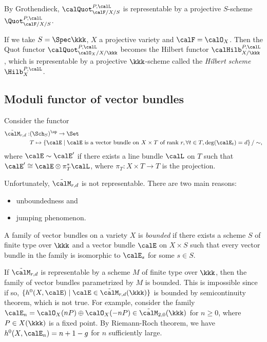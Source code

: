     By Grothendieck, \(\calQuot_{\calF/X/S}^{P,\calL}\) is representable by a projective \(S\)-scheme \(\Quot_{\calF/X/S}^{P,\calL}\).

    If we take \(S = \Spec \kkk\), \(X\) a projective variety and \(\calF = \calO_X\).
    Then the Quot functor \(\calQuot_{\calO_X/X/\kkk}^{P,\calL}\) becomes the Hilbert functor \(\calHilb_{X/\kkk}^{P,\calL}\), which is representable by a projective \(\kkk\)-scheme called the \emph{Hilbert scheme} \(\Hilb_X^{P,\calL}\).

\subsection{Moduli functor of vector bundles}

    Consider the functor 
    \begin{align*}
        \tilde{\calM}_{r,d} : & (\Sch_S)^{\op} \to \Set \\
        & T \mapsto \left\{ 
            \calE 
        \;\middle|\;
            \calE \text{ is a vector bundle on } X \times T \text{ of rank } r, \forall t \in T, \deg(\calE_t) = d
         \right\}/ \sim,
    \end{align*}
    where \(\calE \sim \calE'\) if there exists a line bundle \(\calL\) on \(T\) such that \(\calE' \cong \calE \otimes \pi_T^* \calL\), where \(\pi_T : X \times T \to T\) is the projection.

    Unfortunately, \(\tilde{\calM}_{r,d}\) is not representable.
    There are two main reasons:
    \begin{itemize}
        \item unboundedness and 
        \item jumping phenomenon.
    \end{itemize}

    \begin{definition}\label{def:bounded_family}
        A family of vector bundles on a variety \(X\) is \emph{bounded} 
        if there exists a scheme \(S\) of finite type over \(\kkk\) and a vector bundle \(\calE\) on \(X \times S\) 
        such that every vector bundle in the family is isomorphic to \(\calE_s\) for some \(s \in S\).
    \end{definition}

    If \(\tilde{\calM}_{r,d}\) is representable by a scheme \(M\) of finite type over \(\kkk\), then the family of vector bundles parametrized by \(M\) is bounded.
    This is impossible since if so, \(\{h^0(X,\calE) \mid \calE \in \tilde{\calM}_{r,d}(\kkk)\}\) is bounded by semicontinuity theorem, which is not true.
    For example, consider the family \(\calE_n = \calO_X(nP) \oplus \calO_X(-nP) \in \tilde{\calM}_{2,0}(\kkk)\) for \(n \geq 0\), where \(P \in X(\kkk)\) is a fixed point.
    By Riemann-Roch theorem, we have \(h^0(X,\calE_n) = n + 1-g\) for \(n\) sufficiently large.


